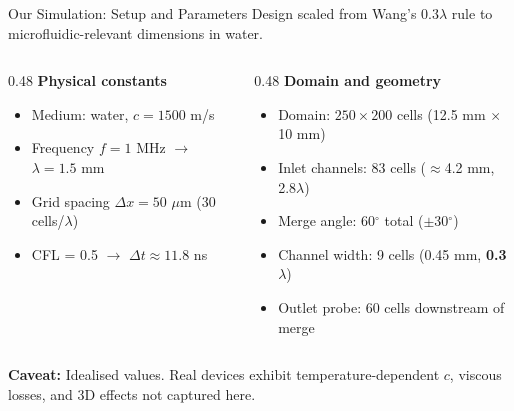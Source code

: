 \documentclass[aspectratio=169,11pt]{beamer}
\begin{document}
\begin{frame}{Our Simulation: Setup and Parameters}
  Design scaled from Wang's $0.3\lambda$ rule to microfluidic-relevant dimensions in water.

  \vspace{0.15cm}
  \begin{columns}[T]
    \begin{column}{0.48\textwidth}
      \footnotesize
      \textbf{Physical constants}
      \begin{itemize}
        \item Medium: water, $c = 1500$ m/s
        \item Frequency $f = 1$ MHz $\rightarrow$ $\lambda = 1.5$ mm
        \item Grid spacing $\Delta x = 50$ $\mu$m (30 cells/$\lambda$)
        \item CFL = 0.5 $\rightarrow$ $\Delta t \approx 11.8$ ns
      \end{itemize}
    \end{column}
    \begin{column}{0.48\textwidth}
      \footnotesize
      \textbf{Domain and geometry}
      \begin{itemize}
        \item Domain: $250 \times 200$ cells (12.5 mm $\times$ 10 mm)
        \item Inlet channels: 83 cells ($\approx$4.2 mm, 2.8$\lambda$)
        \item Merge angle: 60$^\circ$ total ($\pm$30$^\circ$)
        \item Channel width: 9 cells (0.45 mm, \textbf{0.3$\lambda$})
        \item Outlet probe: 60 cells downstream of merge
      \end{itemize}
    \end{column}
  \end{columns}

  \vspace{0.2cm}
  \footnotesize
  \textcolor{gdpBurgundy}{\textbf{Caveat:} Idealised values. Real devices exhibit temperature-dependent $c$, viscous losses, and 3D effects not captured here.}
\end{frame}
\end{document}
